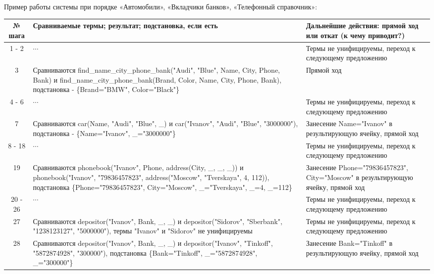 \documentclass[a4paper,12pt]{article}
\begin{document}
Пример работы системы при порядке «Автомобили», «Вкладчики банков», «Телефонный справочник»:
\begin{table}[ht!] 
	\begin{tabularx}{\linewidth}{|c|>{\centering}X|>{\centering}X|}
		\hline
		№ шага & Сравниваемые термы; результат; подстановка, если есть & Дальнейшие действия: прямой ход или откат (к чему приводит?)\tabularnewline
		\hline
		1 - 2 & $\cdots$ & Термы не унифицируемы, переход к следующему предложению \tabularnewline
		\hline
		3 & Сравниваются find\_name\_city\_phone\_bank("Audi"{}, "Blue"{}, Name, City, Phone, Bank) и find\_name\_city\_phone\_bank(Brand, Color, Name, City, Phone, Bank), подстановка - \{Brand="BMW"{}, Color="Black"\} & Прямой ход \tabularnewline
		\hline
		4 - 6 & $\cdots$ & Термы не унифицируемы, переход к следующему предложению \tabularnewline
		\hline
		7 & Сравниваются car(Name, "Audi"{}, "Blue"{}, \_) и car("Ivanov"{}, "Audi"{}, "Blue"{}, "3000000"), подстановка - \{Name="Ivanov"{}, \_="3000000"\}& Занесение Name="Ivanov"{} в результирующую ячейку, прямой ход \tabularnewline
		\hline
		8 - 18 & $\cdots$ & Термы не унифицируемы, переход к следующему предложению \tabularnewline
		\hline
		19 & Сравниваются phonebook("Ivanov"{}, Phone, address(City, \_, \_, \_)) и phonebook("Ivanov"{}, "79836457823"{}, address("Moscow"{}, "Tverskaya"{}, 4, 112)), подстановка \{Phone="79836457823"{}, City="Moscow"{}, \_="Tverskaya"{}, \_=4, \_=112\} & Занесение Phone="79836457823"{}, City="Moscow"{} в результирующую ячейку, прямой ход\tabularnewline
		\hline
		20 - 26  & $\cdots$ & Термы не унифицируемы, переход к следующему предложению \tabularnewline
		\hline
		27 & Сравниваются depositor("Ivanov"{}, Bank, \_, \_) и depositor("Sidorov"{}, "Sberbank"{}, "1238123127"{}, "5000000"), термы "Ivanov" и "Sidorov" не унифицируемы & Термы не унифицируемы, переход к следующему предложению \tabularnewline
		\hline
		28 & Сравниваются depositor("Ivanov"{}, Bank, \_, \_) и depositor("Ivanov"{}, "Tinkoff"{}, "5872874928"{}, "300000"), подстановка \{Bank="Tinkoff"{}, \_="5872874928"{}, \_="300000"\} & Занесение Bank="Tinkoff"{} в результирующую ячейку, прямой ход  \tabularnewline
		\hline
	\end{tabularx}
\end{table}
\newpage
\end{document}

